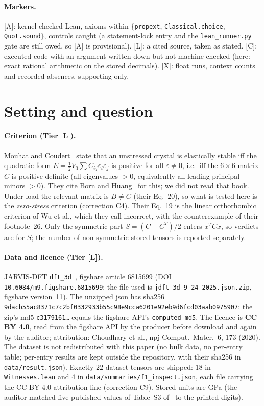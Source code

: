 \documentclass[10pt]{article}
\newcommand{\tier}[1]{\textsf{[#1]}}
\newcommand{\tA}{\tier{A}}
\newcommand{\tL}{\tier{L}}
\newcommand{\tC}{\tier{C}}
\newcommand{\tX}{\tier{X}}
\newcommand{\lean}[1]{\texttt{#1}}
\begin{document}
\paragraph{Markers.} \tA{}: kernel-checked Lean, axioms within $\{$\lean{propext}, \lean{Classical.choice}, \lean{Quot.sound}$\}$, controls caught (a statement-lock entry and the \texttt{lean\_runner.py} gate are still owed, so \tA{} is provisional). \tL{}: a cited source, taken as stated. \tC{}: executed code with an argument written down but not machine-checked (here: exact rational arithmetic on the stored decimals). \tX{}: float runs, context counts and recorded absences, supporting only.

\section{Setting and question}\label{sec:setting}
\paragraph{Criterion (Tier \tL{}).} Mouhat and Coudert~\cite{mc} state that an unstressed crystal is elastically stable iff the quadratic form $E=\tfrac12V_0\sum C_{ij}\varepsilon_i\varepsilon_j$ is positive for all $\varepsilon\ne0$, i.e.\ iff the $6\times6$ matrix $C$ is positive definite (all eigenvalues $>0$, equivalently all leading principal minors $>0$). They cite Born and Huang~\cite{bh} for this; we did not read that book. Under load the relevant matrix is $B\ne C$ (their Eq.~20), so what is tested here is the \emph{zero-stress} criterion (correction C4). Their Eq.~19 is the linear orthorhombic criterion of Wu et al., which they call incorrect, with the counterexample of their footnote~26. Only the symmetric part $S=(C+C^T)/2$ enters $x^TCx$, so verdicts are for $S$; the number of non-symmetric stored tensors is reported separately.

\paragraph{Data and licence (Tier \tL{}).} JARVIS-DFT \texttt{dft\_3d}~\cite{jarvis,jarvis_elastic}, figshare article 6815699 (DOI \texttt{10.6084/m9.figshare.6815699}; the file used is \texttt{jdft\_3d-9-24-2025.json.zip}, figshare version~11). The unzipped json has sha256 \texttt{9dacb55ac8371c7c2bf0332933b55c98e9cca6201e92eb9d6fcd03aab0975907}; the zip's md5 \texttt{c3179161\dots} equals the figshare API's \texttt{computed\_md5}. The licence is \textbf{CC BY 4.0}, read from the figshare API by the producer before download and again by the auditor; attribution: Choudhary et al., npj Comput.\ Mater.\ 6, 173 (2020). The dataset is not redistributed with this paper (no bulk data, no per-entry table; per-entry results are kept outside the repository, with their sha256 in \texttt{data/result.json}). Exactly $22$ dataset tensors are shipped: $18$ in \texttt{Witnesses.lean} and $4$ in \texttt{data/summaries/f1\_inspect.json}, each file carrying the CC BY 4.0 attribution line (correction C9). Stored units are GPa (the auditor matched five published values of Table~S3 of~\cite{jarvis_elastic} to the printed digits).
\end{document}
